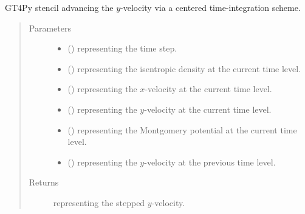 \documentclass[letterpaper,10pt,english]{sphinxmanual}
\begin{document}
\begin{fulllineitems}
\begin{fulllineitems}
\label{\detokenize{api:tasmania.dycore.prognostic_isentropic_nonconservative_centered.PrognosticIsentropicNonconservativeCentered._stencil_stepping_by_neglecting_vertical_advection_velocity_y_defs}}
GT4Py stencil advancing the \(y\)-velocity via a centered time-integration scheme.
\begin{quote}\begin{description}
\item[{Parameters}] \leavevmode\begin{itemize}
\item {} 
 () \textendash{}  representing the time step.

\item {} 
 () \textendash{}  representing the isentropic density at the current time level.

\item {} 
 () \textendash{}  representing the \(x\)-velocity at the current time level.

\item {} 
 () \textendash{}  representing the \(y\)-velocity at the current time level.

\item {} 
 () \textendash{}  representing the Montgomery potential at the current time level.

\item {} 
 () \textendash{}  representing the \(y\)-velocity at the previous time level.

\end{itemize}

\item[{Returns}] \leavevmode
{} representing the stepped \(y\)-velocity.


\end{description}
\end{quote}
\end{fulllineitems}
\end{fulllineitems}
\end{document}
